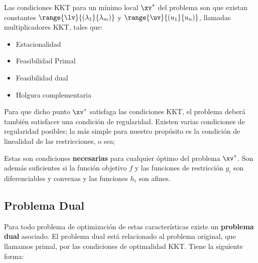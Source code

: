 
Las condiciones KKT para un mínimo local $\xv^*$ del problema son que existan constantes $\range{\lv}{(\lambda_1}{\lambda_m)}$ y $\range{\uv}{(u_1}{u_n)}$, llamadas multiplicadores KKT, tales que:

\begin{itemize}

\item Estacionalidad\\

\item Feasibilidad Primal \\

\item Feasibilidad dual\\

\item Holgura complementaria\\

\end{itemize}


Para que dicho punto $\xv^*$ satisfaga las condiciones KKT, el problema deberá también satisfacer una condición de regularidad. Existen varias condiciones de regularidad posibles; la más simple para nuestro propósito es la condición de linealidad de las restricciones, o sea;



Estas son condiciones \textbf{necesarias} para cualquier óptimo del problema $\xv^*$. Son además suficientes si la función objetivo $f$ y las funciones de restricción $g_i$ son diferenciables y convexas y las funciones $h_i$ son afines.

\subsection{Problema Dual}


Para todo problema de optimización de estas características existe un \textbf{problema dual} asociado. El problema dual está relacionado al problema original, que llamamos primal, por las condiciones de optimalidad KKT. Tiene la siguiente forma:


